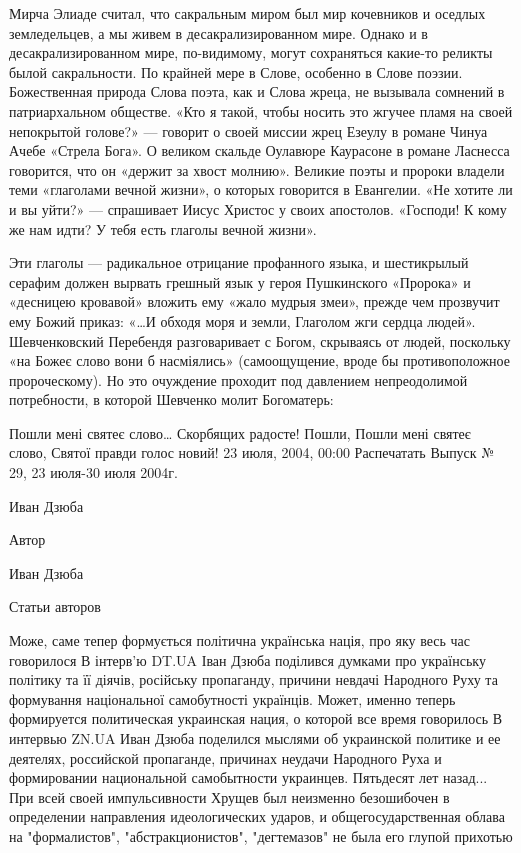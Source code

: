 Мирча Элиаде считал, что сакральным миром был мир кочевников и оседлых
земледельцев, а мы живем в десакрализированном мире. Однако и в
десакрализированном мире, по-видимому, могут сохраняться какие-то реликты былой
сакральности. По крайней мере в Слове, особенно в Слове поэзии. Божественная
природа Слова поэта, как и Слова жреца, не вызывала сомнений в патриархальном
обществе. «Кто я такой, чтобы носить это жгучее пламя на своей непокрытой
голове?» — говорит о своей миссии жрец Езеулу в романе Чинуа Ачебе «Стрела
Бога». О великом скальде Оулавюре Каурасоне в романе Ласнесса говорится, что он
«держит за хвост молнию». Великие поэты и пророки владели теми «глаголами
вечной жизни», о которых говорится в Евангелии. «Не хотите ли и вы уйти?» —
спрашивает Иисус Христос у своих апостолов. «Господи! К кому же нам идти? У
тебя есть глаголы вечной жизни».

Эти глаголы — радикальное отрицание профанного языка, и шестикрылый серафим
должен вырвать грешный язык у героя Пушкинского «Пророка» и «десницею кровавой»
вложить ему «жало мудрыя змеи», прежде чем прозвучит ему Божий приказ: «…И
обходя моря и земли, Глаголом жги сердца людей». Шевченковский Перебендя
разговаривает с Богом, скрываясь от людей, поскольку «на Божеє слово вони б
насміялись» (самоощущение, вроде бы противоположное пророческому). Но это
очуждение проходит под давлением непреодолимой потребности, в которой Шевченко
молит Богоматерь:

Пошли мені святеє слово…
Скорбящих радосте! Пошли,
Пошли мені святеє слово,
Святої правди голос новий!
 23 июля, 2004, 00:00
Распечатать
Выпуск № 29, 23 июля-30 июля 2004г.

    Иван Дзюба

Автор

    Иван Дзюба

Статьи авторов

    Може, саме тепер формується політична українська нація, про яку весь час говорилося В інтерв'ю DT.UA Іван Дзюба поділився думками про українську політику та її діячів, російську пропаганду, причини невдачі Народного Руху та формування національної самобутності українців.
    Может, именно теперь формируется политическая украинская нация, о которой все время говорилось В интервью ZN.UA Иван Дзюба поделился мыслями об украинской политике и ее деятелях, российской пропаганде, причинах неудачи Народного Руха и формировании национальной самобытности украинцев.
    Пятьдесят лет назад... При всей своей импульсивности Хрущев был неизменно безошибочен в определении направления идеологических ударов, и общегосударственная облава на "формалистов", "абстракционистов", "дегтемазов" не была его глупой прихотью

